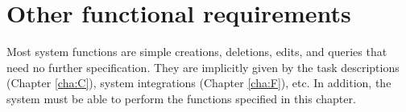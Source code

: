 \documentclass[Main]{subfiles}
\begin{document}
\chapter{Other functional requirements}
Most system functions are simple creations, deletions, edits, and queries that need no further specification. They are implicitly given by the task descriptions (Chapter \ref{cha:C}), system integrations (Chapter \ref{cha:F}), etc. In addition, the system must be able to perform the functions specified in this chapter.


%

%
\end{document}
